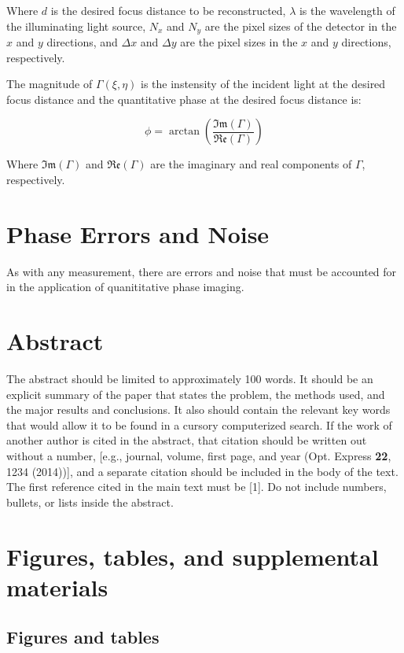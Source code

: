 \documentclass[10pt,letterpaper]{article}
\begin{document}
 Where $d$ is the desired focus distance to be reconstructed, $\lambda$ is the wavelength of the illuminating light source, $N_x$ and $N_y$ are the pixel sizes of the detector in the $x$ and $y$ directions, and $\Delta x$ and $\Delta y$ are the pixel sizes in the $x$ and $y$ directions, respectively.
 
 The magnitude of $\Gamma(\xi,\eta)$ is the instensity of the incident light at the desired focus distance and the quantitative phase at the desired focus distance is:
 
 \begin{equation}
 \phi=\arctan\left(\frac{\mathfrak{Im}(\Gamma)}{\mathfrak{Re}(\Gamma)}\right)
 \end{equation}
 
 Where $\mathfrak{Im}(\Gamma)$ and $\mathfrak{Re}(\Gamma)$ are the imaginary and real components of $\Gamma$, respectively.
 
\section{Phase Errors and Noise}

As with any measurement, there are errors and noise that must be accounted for in the application of quanititative phase imaging.

\section{Abstract}
The abstract should be limited to approximately 100 words. It should be an explicit summary of the paper that states the problem, the methods used, and the major results and conclusions. It also should contain the relevant key words that would allow it to be found in a cursory computerized search. If the work of another author is cited in the abstract, that citation should be written out without a number, [e.g., journal, volume, first page, and year (Opt. Express {\bf 22}, 1234 (2014))], and a separate citation should be included in the body of the text. The first reference cited in the main text must be [1]. Do not include numbers, bullets, or lists inside the abstract.

\section{Figures, tables, and supplemental materials}

\subsection{Figures and tables}
\end{document}
